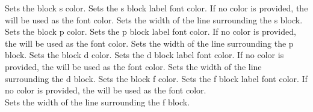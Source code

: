 {Sets the block s color.}\vspace{-2pt}%
\label{option_s block_font color}%
%
{Sets the s block label font color. If no color is provided, the  will be used as the font color.}\vspace{-2pt}%
\label{option_s block line width}%
%
{Sets the width of the line surrounding the s block.}\vspace{-2pt}%
\label{option_p block color}%
%
{Sets the block p color.}\vspace{-2pt}%
\label{option_p block_font color}%
%
{Sets the p block label font color. If no color is provided, the  will be used as the font color.}\vspace{-2pt}%
\label{option_p block line width}%
%
{Sets the width of the line surrounding the p block.}\vspace{-2pt}%
\label{option_d block color}%
%
{Sets the block d color.}\vspace{-2pt}%
\label{option_d block_font color}%
%
{Sets the d block label font color. If no color is provided, the  will be used as the font color.}\vspace{-2pt}%
\label{option_d block line width}%
%
{Sets the width of the line surrounding the d block.}\vspace{-2pt}%
\label{option_f block color}%
%
{Sets the block f color.}\vspace{-2pt}%
\label{option_f block_font color}%
%
{Sets the f block label font color. If no color is provided, the  will be used as the font color.}\vspace{-2pt}%
\newpage\ \\ [-32pt]%
\label{option_f block line width}%
%
{Sets the width of the line surrounding the f block.}%
